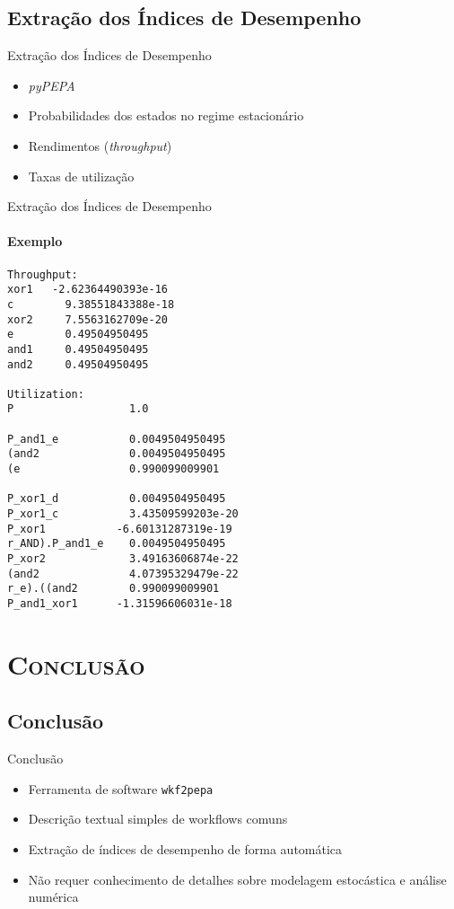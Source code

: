 \documentclass[xcolor=x11names,compress]{beamer}
\renewcommand{\(}{\begin{columns}}
\renewcommand{\)}{\end{columns}}
\newcommand{\<}[1]{\begin{column}{#1}}
\renewcommand{\>}{\end{column}}
\begin{document}
    \subsection{Extração dos Índices de Desempenho}
        \begin{frame}{Extração dos Índices de Desempenho}
            \begin{itemize}[<+->]
                \item \emph{pyPEPA}
                \item Probabilidades dos estados no regime estacionário
                \item Rendimentos (\emph{throughput})
                \item Taxas de utilização
            \end{itemize}
        \end{frame}

\begin{frame}[fragile]{Extração dos Índices de Desempenho}
    \framesubtitle{Exemplo}
    \begin{lstlisting}[basicstyle=\tiny]
Throughput:
xor1   -2.62364490393e-16
c        9.38551843388e-18
xor2     7.5563162709e-20
e        0.49504950495
and1     0.49504950495
and2     0.49504950495

Utilization:
P                  1.0

P_and1_e           0.0049504950495
(and2              0.0049504950495
(e                 0.990099009901

P_xor1_d           0.0049504950495
P_xor1_c           3.43509599203e-20
P_xor1           -6.60131287319e-19
r_AND).P_and1_e    0.0049504950495
P_xor2             3.49163606874e-22
(and2              4.07395329479e-22
r_e).((and2        0.990099009901
P_and1_xor1      -1.31596606031e-18
    \end{lstlisting}
\end{frame}

\section{\scshape Conclusão}

    \subsection{Conclusão}
        \begin{frame}{Conclusão}
            \begin{itemize}[<+->]
                \item Ferramenta de software \texttt{wkf2pepa}
                \item Descrição textual simples de workflows comuns
                \item Extração de índices de desempenho de forma automática
                \item Não requer conhecimento de detalhes sobre modelagem estocástica e análise numérica
            \end{itemize}
        \end{frame}
\end{document}
